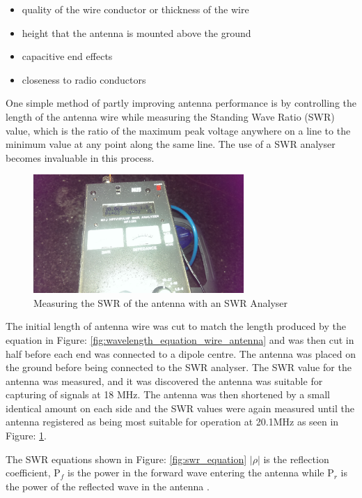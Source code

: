 \documentclass[runningheads,a4paper]{llncs}
\begin{document}
\begin{itemize}
	\item quality of the wire conductor or thickness of the wire
	\item height that the antenna is mounted above the ground
	\item capacitive end effects
	\item closeness to radio conductors
\end{itemize}

One simple method of partly improving antenna performance is by controlling the length of the antenna wire while measuring the Standing Wave Ratio (\gls{SWR}) value, which is the ratio of the maximum peak voltage anywhere on a line to the minimum value at any point along the same line. The use of a \gls{SWR} analyser becomes invaluable in this process.

%
\begin{figure}[here]
\centering
\includegraphics[width=8cm]{images/34}
\caption{Measuring the SWR of the antenna with an SWR Analyser}
\label{fig:swr_analyser_measuring_antenna}
\end{figure}
%

The initial length of antenna wire was cut to match the length produced by the equation in Figure: \ref{fig:wavelength_equation_wire_antenna} and was then cut in half before each end was connected to a dipole centre. The antenna was placed on the ground before being connected to the \gls{SWR} analyser. The \gls{SWR} value for the antenna was measured, and it was discovered the antenna was suitable for capturing of signals at 18 MHz. The antenna was then shortened by a small identical amount on each side and the \gls{SWR} values were again measured until the antenna registered as being most suitable for operation at 20.1MHz as seen in Figure:  \ref{fig:swr_analyser_measuring_antenna}. 

The \gls{SWR} equations shown in Figure: \ref{fig:swr_equation} $|\rho|$ is the reflection coefficient, P$_{f}$ is the power in the forward wave entering the antenna while P$_{r}$ is the power of the reflected wave in the antenna \citep{arrl-00}.
\end{document}
